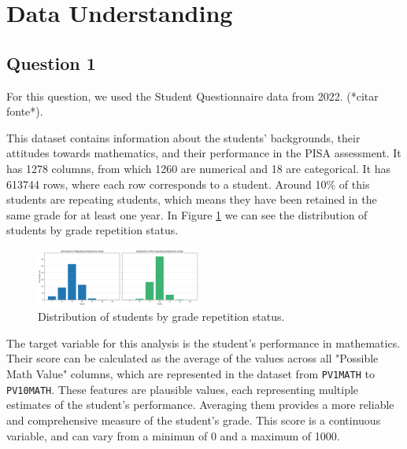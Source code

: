 \section{Data Understanding}\label{sec:data_understanding}

\subsection{Question 1}

For this question, we used the Student Questionnaire data from 2022. (*citar fonte*).

This dataset contains information about the students' backgrounds, their attitudes towards mathematics, and their performance in the PISA assessment. It has 1278 columns, from which 1260 are numerical and 18 are categorical.
It has 613744 rows, where each row corresponds to a student. Around 10\% of this students are repeating students, which means they have been retained in the same grade for at least one year.
In Figure \ref{fig:grade_distribution} we can see the distribution of students by grade repetition status.

\begin{figure}[H]
    \centering
    \includegraphics[width=0.48\textwidth]{figures/Q1_GradeDistribution.png}
    \caption{Distribution of students by grade repetition status.}
    \label{fig:grade_distribution}
\end{figure}

The target variable for this analysis is the student's performance in mathematics. Their score can be calculated as the average of the values across all "Possible Math Value" columns, which are represented in the dataset from \texttt{PV1MATH} to \texttt{PV10MATH}. These features are plausible values, each representing multiple estimates of the student's performance. Averaging them provides a more reliable and comprehensive measure of the student's grade.
This score is a continuous variable, and can vary from a minimun of 0 and a maximum of 1000.

